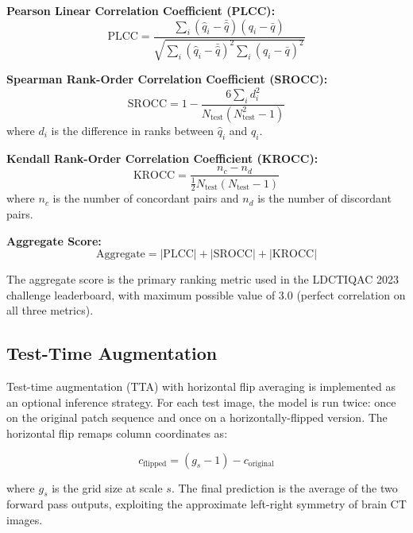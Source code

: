 \textbf{Pearson Linear Correlation Coefficient (PLCC):}
\begin{equation}
    \text{PLCC} = \frac{\sum_{i}(\hat{q}_i - \bar{\hat{q}})(q_i - \bar{q})}
                       {\sqrt{\sum_{i}(\hat{q}_i - \bar{\hat{q}})^2
                              \sum_{i}(q_i - \bar{q})^2}}
\end{equation}

\textbf{Spearman Rank-Order Correlation Coefficient (SROCC):}
\begin{equation}
    \text{SROCC} = 1 - \frac{6\sum_{i} d_i^2}{N_{\text{test}}(N_{\text{test}}^2 - 1)}
\end{equation}
where $d_i$ is the difference in ranks between $\hat{q}_i$ and $q_i$.

\textbf{Kendall Rank-Order Correlation Coefficient (KROCC):}
\begin{equation}
    \text{KROCC} = \frac{n_c - n_d}{\frac{1}{2}N_{\text{test}}(N_{\text{test}} - 1)}
\end{equation}
where $n_c$ is the number of concordant pairs and $n_d$ is the number of discordant pairs.

\textbf{Aggregate Score:}
\begin{equation}
    \text{Aggregate} = |\text{PLCC}| + |\text{SROCC}| + |\text{KROCC}|
    \label{eq:aggregate}
\end{equation}

The aggregate score is the primary ranking metric used in the LDCTIQAC 2023 challenge
leaderboard, with maximum possible value of 3.0 (perfect correlation on all three
metrics).

\subsection{Test-Time Augmentation}

Test-time augmentation (TTA) with horizontal flip averaging is implemented as an optional
inference strategy. For each test image, the model is run twice: once on the original
patch sequence and once on a horizontally-flipped version. The horizontal flip remaps
column coordinates as:

\begin{equation}
    c_{\text{flipped}} = (g_s - 1) - c_{\text{original}}
\end{equation}

where $g_s$ is the grid size at scale $s$. The final prediction is the average of the
two forward pass outputs, exploiting the approximate left-right symmetry of brain CT
images.

